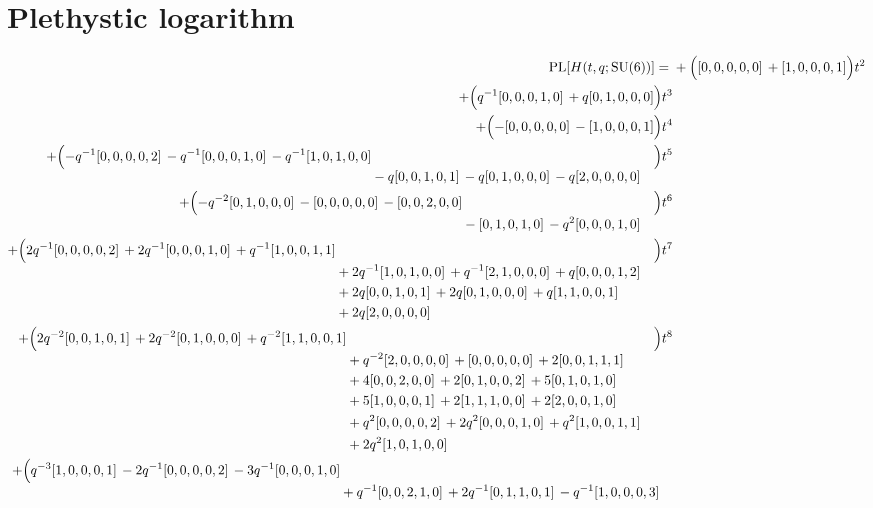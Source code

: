 \documentclass[10pt]{article}
\begin{document}
\section{Plethystic logarithm}
\[
\begin{aligned}
\operatorname{PL}[H(t,q;\mathrm{SU}(6))] ={}&
  + \Bigl([0,0,0,0,0]\,+[1,0,0,0,1]\Bigr)t^{2} \\
  + \Bigl(q^{-1}[0,0,0,1,0]\,+q[0,1,0,0,0]\Bigr)t^{3} \\
  + \Bigl(-[0,0,0,0,0]\,-[1,0,0,0,1]\Bigr)t^{4} \\
  + \Bigl(\begin{aligned}[t]-q^{-1}[0,0,0,0,2]\,-q^{-1}[0,0,0,1,0]\,-q^{-1}[1,0,1,0,0] \\
  &{}-q[0,0,1,0,1]\,-q[0,1,0,0,0]\,-q[2,0,0,0,0]\end{aligned}\Bigr)t^{5} \\
  + \Bigl(\begin{aligned}[t]-q^{-2}[0,1,0,0,0]\,-[0,0,0,0,0]\,-[0,0,2,0,0] \\
  &{}-[0,1,0,1,0]\,-q^{2}[0,0,0,1,0]\end{aligned}\Bigr)t^{6} \\
  + \Bigl(\begin{aligned}[t]2q^{-1}[0,0,0,0,2]\,+2q^{-1}[0,0,0,1,0]\,+q^{-1}[1,0,0,1,1] \\
  &{}+2q^{-1}[1,0,1,0,0]\,+q^{-1}[2,1,0,0,0]\,+q[0,0,0,1,2] \\
  &{}+2q[0,0,1,0,1]\,+2q[0,1,0,0,0]\,+q[1,1,0,0,1] \\
  &{}+2q[2,0,0,0,0]\end{aligned}\Bigr)t^{7} \\
  + \Bigl(\begin{aligned}[t]2q^{-2}[0,0,1,0,1]\,+2q^{-2}[0,1,0,0,0]\,+q^{-2}[1,1,0,0,1] \\
  &{}+q^{-2}[2,0,0,0,0]\,+[0,0,0,0,0]\,+2[0,0,1,1,1] \\
  &{}+4[0,0,2,0,0]\,+2[0,1,0,0,2]\,+5[0,1,0,1,0] \\
  &{}+5[1,0,0,0,1]\,+2[1,1,1,0,0]\,+2[2,0,0,1,0] \\
  &{}+q^{2}[0,0,0,0,2]\,+2q^{2}[0,0,0,1,0]\,+q^{2}[1,0,0,1,1] \\
  &{}+2q^{2}[1,0,1,0,0]\end{aligned}\Bigr)t^{8} \\
  + \Bigl(\begin{aligned}[t]q^{-3}[1,0,0,0,1]\,-2q^{-1}[0,0,0,0,2]\,-3q^{-1}[0,0,0,1,0] \\
  &{}+q^{-1}[0,0,2,1,0]\,+2q^{-1}[0,1,1,0,1]\,-q^{-1}[1,0,0,0,3] \\

\end{aligned}
\end{aligned}\]
\end{document}
